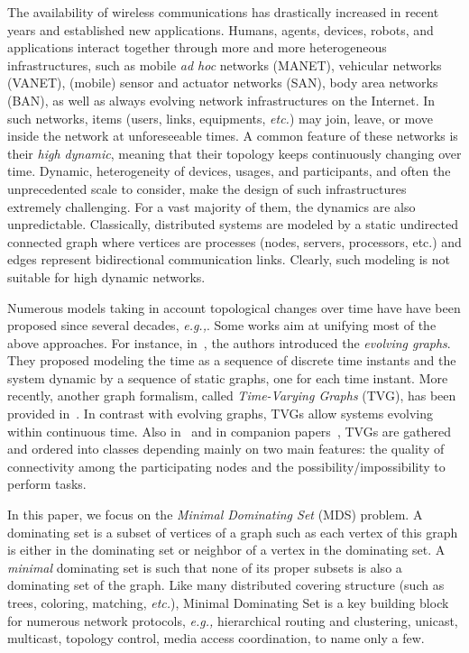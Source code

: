 \documentclass{article}
\newcommand{\eg}{{\em e.g.,}\xspace}
\begin{document}
The availability of wireless communications has drastically increased in recent years and established new applications. Humans, agents, devices, robots, and applications interact together through more and more heterogeneous infrastructures, such as mobile \emph{ad hoc} networks (MANET), vehicular networks (VANET), (mobile) sensor and actuator networks (SAN), body area networks (BAN), as well as always evolving network infrastructures on the Internet. In such networks, items (users, links, equipments, {\em etc.}) may join, leave, or move inside the network at unforeseeable times. A common feature of these networks is their {\em high dynamic}, meaning that their topology keeps continuously changing over time. Dynamic, heterogeneity of devices, usages, and participants, and often the unprecedented scale to consider, make the design of such infrastructures extremely challenging. For a vast majority of them, the dynamics are also unpredictable. Classically, distributed systems are modeled by a static undirected connected graph where vertices are processes (nodes, servers, processors, etc.) and edges represent bidirectional communication links.  Clearly, such modeling is not suitable for high dynamic networks.

Numerous models taking in account topological changes over time have have been proposed since several decades, \eg \cite{AKMUV12,AE84,CCF09,F03,F04,FGM07,SW09}. Some works aim at unifying most of the above approaches. For instance, in~\cite{XFJ03}, the authors introduced the {\em evolving graphs}. They proposed modeling the time as a sequence of discrete time instants and the system dynamic by a sequence of static graphs, one for each time instant. More recently, another graph formalism, called {\em Time-Varying Graphs} (TVG), has been provided in~\cite{CFQS12}. In contrast with evolving graphs, TVGs allow systems evolving within continuous time. Also in~\cite{CFQS12} and in companion papers~\cite{CFMS10,CFMS12}, TVGs are gathered and ordered into classes depending mainly on two main features: the quality of connectivity among the participating nodes and the possibility/impossibility to perform tasks.

In this paper, we focus on the {\em Minimal Dominating Set} (MDS) problem. A dominating set is a subset of vertices of a graph such as each vertex of this graph is either in the dominating set or neighbor of a vertex in the dominating set. A \emph{minimal} dominating set is such that none of its proper subsets is also a dominating set of the graph. Like many distributed covering structure (such as trees, coloring, matching, \emph{etc.}), Minimal Dominating Set is a key building block for numerous network protocols, \eg hierarchical routing and clustering, unicast, multicast, topology control, media access coordination, to name only a few.
\end{document}
